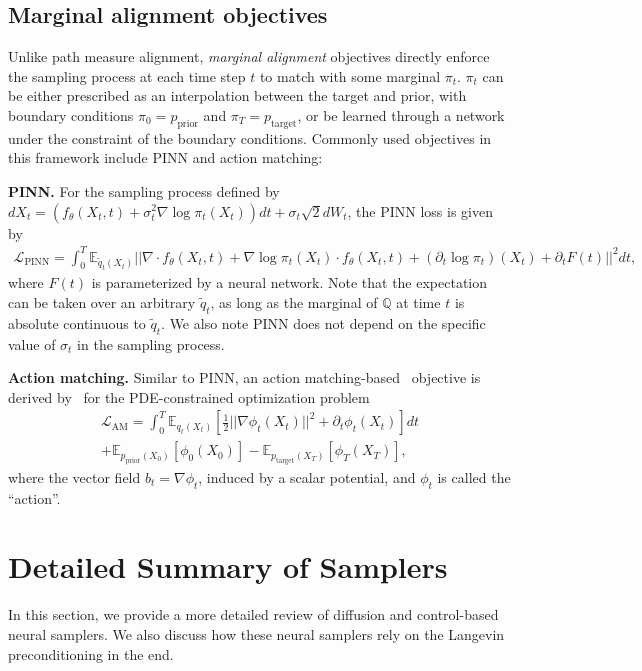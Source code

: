 \documentclass{article} %
\begin{document}
\subsection{Marginal alignment objectives}
Unlike path measure alignment, \emph{marginal alignment} objectives directly enforce the sampling process at each time step $t$ to match with some marginal $\pi_t$.
$\pi_t$ can be either prescribed as an interpolation between the target and prior, with boundary conditions $\pi_0 = p_\text{prior}$ and $\pi_T = p_\text{target}$, or be learned through a network under the constraint of the boundary conditions. 
Commonly used objectives in this framework include PINN and action matching:

\textbf{PINN.} For the sampling process defined by $ dX_t =   \left(f_\theta(X_t, t) +\sigma_t^2  \nabla \log \pi_t (X_t)\right) dt + \sigma_t\sqrt{2} dW_t$, the PINN loss is given by
\begin{align}
    \mathcal{L}_{\text{PINN}} = \int_0^T \mathbb{E}_{\tilde{q}_t(X_t)}  ||
  \nabla \cdot f_\theta(X_t, t) + \nabla \log\pi_t(X_t) \cdot f_\theta(X_t, t) + (\partial_t \log\pi_t)(X_t) + \partial_t F(t) 
    ||^2 dt,
\end{align}
where $F(t) $ is parameterized by a neural network. 
Note that the expectation can be taken over an arbitrary $\tilde{q}_t$, as long as the marginal of $\mathbb{Q}$ at time $t$ is absolute continuous to $\tilde{q}_t$.
We also note PINN does not depend on the specific value of $\sigma_t$ in the sampling process.

\textbf{Action matching.} Similar to PINN, an action matching-based~\citep{neklyudov2023action} objective is derived by~\citep{albergo2024nets} for the PDE-constrained optimization problem
\begin{multline}
\mathcal{L}_{\text{AM}} =  \int_0^T  \mathbb{E}_{q_t(X_t)} \left[ \frac{1}{2} ||\nabla \phi_t(X_t)||^2 + \partial_t \phi_t(X_t)\right] dt \\+ \mathbb{E}_{p_{\text{prior}}(X_0)} \left[ \phi_0(X_0)\right] - \mathbb{E}_{p_{\text{target}}(X_T)} \left[ \phi_T(X_T) \right] ,
\end{multline}
where the vector field $b_t = \nabla \phi_t$, induced by a scalar potential, and $\phi_t$ is called the ``action''.


\section{Detailed Summary of Samplers}\label{appendix:review}
In this section, we provide a more detailed review of diffusion and control-based neural samplers.
We also discuss how these neural samplers rely on the Langevin preconditioning in the end.
\end{document}

